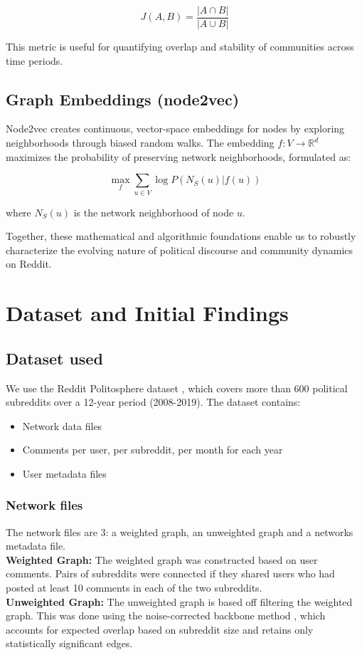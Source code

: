 \documentclass{article}
\theoremstyle{definition}
\begin{document}
$$
J(A,B) = \frac{|A \cap B|}{|A \cup B|}
$$

This metric is useful for quantifying overlap and stability of communities across time periods.

\subsection{Graph Embeddings (node2vec)}
Node2vec creates continuous, vector-space embeddings for nodes by exploring neighborhoods through biased random walks. The embedding $f: V \to \mathbb{R}^d$ maximizes the probability of preserving network neighborhoods, formulated as:

$$
\max_f \sum_{u \in V} \log P(N_S(u)|f(u))
$$

where $N_S(u)$ is the network neighborhood of node $u$.

Together, these mathematical and algorithmic foundations enable us to robustly characterize the evolving nature of political discourse and community dynamics on Reddit.


\section{Dataset and Initial Findings}
\subsection{Dataset used}
We use the Reddit Politosphere dataset \cite{hofmann2022politosphere}, which covers more than 600 political subreddits over a 12-year period (2008-2019). The dataset contains:
\begin{itemize}
    \item Network data files
    \item Comments per user, per subreddit, per month for each year
    \item User metadata files
\end{itemize}

\subsubsection{Network files}
The network files are 3: a weighted graph, an unweighted graph and a networks metadata file.
\newline
\\
\textbf{Weighted Graph:} 
\newline
The weighted graph was constructed based on user comments. Pairs of subreddits were connected if they shared users who had posted at least 10 comments in each of the two subreddits.
\newline
\\
\textbf{Unweighted Graph:} 
\newline
The unweighted graph is based off filtering the weighted graph. This was done using the noise-corrected backbone method \cite{backbone}, which accounts for expected overlap based on subreddit size and retains only statistically significant edges.
\end{document}
